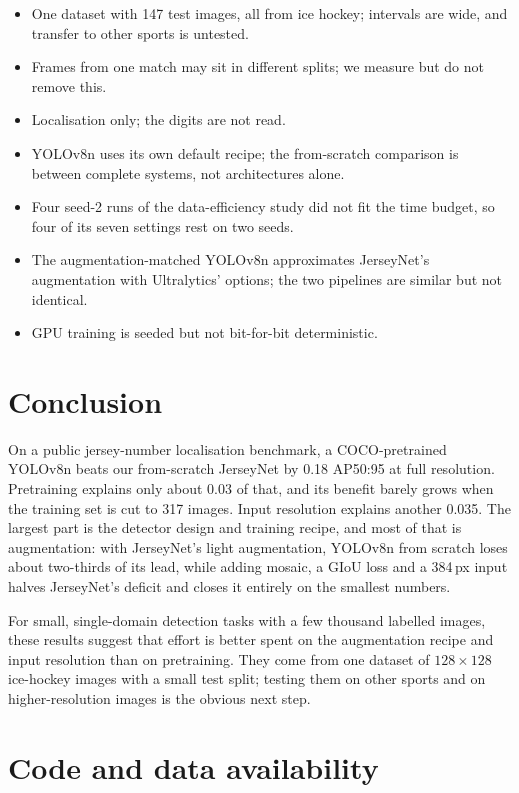 \documentclass[10pt,a4paper]{article}
\begin{document}
\begin{itemize}
  \item One dataset with 147 test images, all from ice hockey; intervals are wide, and transfer to
    other sports is untested.
  \item Frames from one match may sit in different splits; we measure but do not remove this.
  \item Localisation only; the digits are not read.
  \item YOLOv8n uses its own default recipe; the from-scratch comparison is between complete
    systems, not architectures alone.
  \item Four seed-2 runs of the data-efficiency study did not fit the time budget, so four of its
    seven settings rest on two seeds.
  \item The augmentation-matched YOLOv8n approximates JerseyNet's augmentation with Ultralytics'
    options; the two pipelines are similar but not identical.
  \item GPU training is seeded but not bit-for-bit deterministic.
\end{itemize}

\section{Conclusion}

On a public jersey-number localisation benchmark, a COCO-pretrained YOLOv8n beats our
from-scratch JerseyNet by 0.18 AP50:95 at full resolution. Pretraining explains only about 0.03 of
that, and its benefit barely grows when the training set is cut to 317 images. Input resolution
explains another 0.035. The largest part is the detector design and training recipe, and most of
that is augmentation: with JerseyNet's light augmentation, YOLOv8n from scratch loses about
two-thirds of its lead, while adding mosaic, a GIoU loss and a 384\,px input halves JerseyNet's
deficit and closes it entirely on the smallest numbers.

For small, single-domain detection tasks with a few thousand labelled images, these results
suggest that effort is better spent on the augmentation recipe and input resolution than on
pretraining. They come from one dataset of $128\times128$ ice-hockey images with a small test
split; testing them on other sports and on higher-resolution images is the obvious next step.

\section*{Code and data availability}
\end{document}
